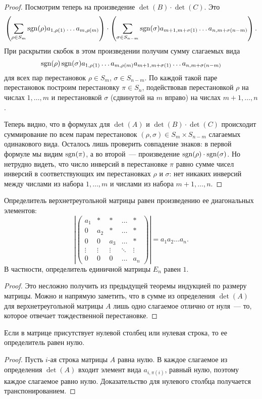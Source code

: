 \begin{proof}
Посмотрим теперь на произведение $\det(B)\cdot\det(C)$. Это
$$
\left(\sum_{\rho\in S_m}\operatorname{sgn}(\rho)a_{1,\rho(1)}\dots a_{m,\rho(m)}\right)\cdot
\left(\sum_{\sigma\in S_{n-m}}\operatorname{sgn}(\sigma)a_{m+1,m+\sigma(1)}\dots a_{n,m+\sigma(n-m)}\right).
$$
При раскрытии скобок в этом произведении получим сумму слагаемых вида
$$\operatorname{sgn}(\rho)\operatorname{sgn}(\sigma)a_{1,\rho(1)}\dots
a_{m,\rho(m)}a_{m+1,m+\sigma(1)}\dots a_{n,m+\sigma(n-m)}$$ для всех пар
перестановок $\rho\in S_m$, $\sigma\in S_{n-m}$. По каждой такой паре
перестановок построим перестановку $\pi\in S_n$, подействовав
перестановкой $\rho$ на числах $1,\dots,m$ и перестановкой $\sigma$
(сдвинутой на $m$ вправо) на числах $m+1,\dots,n$.

Теперь видно, что в формулах для $\det(A)$ и $\det(B)\cdot\det(C)$
происходит суммирование по всем парам перестановок $(\rho,\sigma)\in
S_m\times S_{n-m}$ слагаемых одинакового вида. Осталось лишь проверить
совпадение знаков: в первой формуле мы видим $\operatorname{sgn}(\pi)$, а во
второй~--- произведение $\operatorname{sgn}(\rho)\cdot\operatorname{sgn}(\sigma)$. Но нетрудно
видеть, что число инверсий в перестановке $\pi$ равно сумме чисел
инверсий в соответствующих им перестановках $\rho$ и $\sigma$: нет
никаких инверсий между числами из набора $1,\dots,m$ и числами из
набора $m+1,\dots,n$.
\end{proof}

\begin{corollary}\label{cor_ut_det}
Определитель верхнетреугольной матрицы равен произведению ее
диагональных элементов:
$$
\left|
\begin{pmatrix}
a_1 & *   & *   & \dots & *\\
0   & a_2 & *   & \dots & *\\
0   & 0   & a_3 & \dots & *\\
\vdots & \vdots & \vdots & \ddots & \vdots\\
0 & 0 & 0 & \dots & a_n
\end{pmatrix}
\right| = a_1a_2\dots a_n.
$$
В частности, определитель единичной матрицы $E_n$ равен $1$.
\end{corollary}
\begin{proof}
Это несложно получить из предыдущей теоремы индукцией по размеру
матрицы. Можно и напрямую заметить, что в сумме из определения
$\det(A)$ для верхнетреугольной матрицы $A$ лишь одно слагаемое
отлично от нуля~--- то, которое отвечает тождественной перестановке.
\end{proof}

\begin{proposition}\label{prop_det_zero_row}
Если в матрице присутствует нулевой столбец или нулевая строка, то ее
определитель равен нулю.
\end{proposition}
\begin{proof}
Пусть $i$-ая строка матрицы $A$ равна нулю.
В каждое слагаемое из определения $\det(A)$ входит элемент вида
$a_{i,\pi(i)}$, равный нулю, поэтому каждое слагаемое равно
нулю. Доказательство для нулевого столбца получается
транспонированием.
\end{proof}

